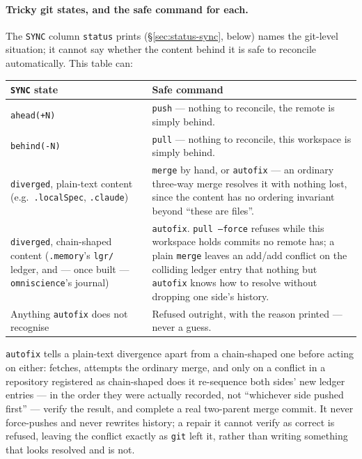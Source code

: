 \paragraph{Tricky git states, and the safe \cgscli{} command for each.}
The \texttt{SYNC} column \texttt{status} prints (\S\ref{sec:status-sync},
below) names the git-level situation; it cannot say whether the content
behind it is safe to reconcile automatically. This table can:

\begin{center}
\begin{tabular}{lp{8.7cm}}
\textbf{\texttt{SYNC} state} & \textbf{Safe command} \\
\hline
\texttt{ahead(+N)}          & \texttt{push} --- nothing to reconcile, the
  remote is simply behind. \\
\texttt{behind(-N)}         & \texttt{pull} --- nothing to reconcile, this
  workspace is simply behind. \\
\texttt{diverged}, plain-text content (e.g.\ \texttt{.localSpec},
  \texttt{.claude}) & \texttt{merge} by hand, or \texttt{autofix} --- an
  ordinary three-way merge resolves it with nothing lost, since the
  content has no ordering invariant beyond ``these are files''. \\
\texttt{diverged}, chain-shaped content (\texttt{.memory}'s \texttt{lgr/}
  ledger, and --- once built --- \texttt{omniscience}'s journal) &
  \texttt{autofix}. \texttt{pull --force} refuses while this workspace holds
  commits no remote has; a plain \texttt{merge} leaves an add/add conflict on the
  colliding ledger entry that nothing but \texttt{autofix} knows how to
  resolve without dropping one side's history. \\
Anything \texttt{autofix} does not recognise & Refused outright, with the
  reason printed --- never a guess. \\
\end{tabular}
\end{center}

\texttt{autofix} tells a plain-text divergence apart from a chain-shaped
one before acting on either: fetches, attempts the ordinary merge, and
only on a conflict in a repository registered as chain-shaped does it
re-sequence both sides' new ledger entries --- in the order they were
actually recorded, not ``whichever side pushed first'' --- verify the
result, and complete a real two-parent merge commit. It never
force-pushes and never rewrites history; a repair it cannot verify as
correct is refused, leaving the conflict exactly as \texttt{git} left it,
rather than writing something that looks resolved and is not.

